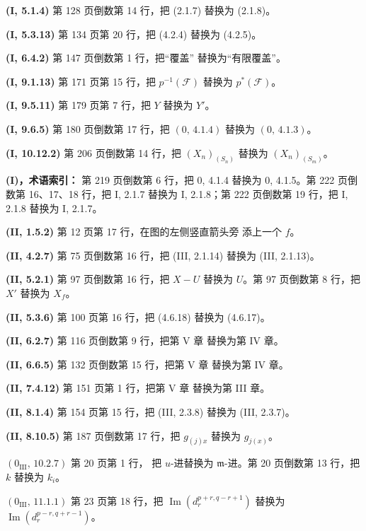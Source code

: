 \documentclass[UTF8,fontset=none,11pt,oneside,openany]{ctexbook}
\newcommand{\oldpage}[2][]{%
  \hypertarget{ega-source-page-#1-#2}{}%
  \marginnote{\scriptsize\textbf{#1}~|~#2}\ignorespaces}
\begin{document}
\noindent\textbf{(I, 5.1.4)} 第 128 页倒数第 14 行，把 (2.1.7)
替换为 (2.1.8)。

\noindent\textbf{(I, 5.3.13)} 第 134 页第 20 行，把 (4.2.4)
替换为 (4.2.5)。

\noindent\textbf{(I, 6.4.2)} 第 147 页倒数第 1 行，把“覆盖”
替换为“有限覆盖”。

\noindent\textbf{(I, 9.1.13)} 第 171 页第 15 行，把
$p^{-1}(\mathscr F)$ 替换为 $p^*(\mathscr F)$。

\noindent\textbf{(I, 9.5.11)} 第 179 页第 7 行，把 $Y$ 替换为 $Y'$。

\noindent\textbf{(I, 9.6.5)} 第 180 页倒数第 17 行，把
$(0,\,4.1.4)$ 替换为 $(0,\,4.1.3)$。

\noindent\textbf{(I, 10.12.2)} 第 206 页倒数第 14 行，把
$(X_n)_{(S_n)}$ 替换为 $(X_n)_{(S_m)}$。

\clearpage
\oldpage[III]{218}
\noindent\textbf{(I)，术语索引：} 第 219 页倒数第 6 行，把
0, 4.1.4 替换为 0, 4.1.5。第 222 页倒数第 16、17、18 行，把
I, 2.1.7 替换为 I, 2.1.8；第 222 页倒数第 19 行，把 I, 2.1.8
替换为 I, 2.1.7。

\noindent\textbf{(II, 1.5.2)} 第 12 页第 17 行，在图的左侧竖直箭头旁
添上一个 $f$。

\noindent\textbf{(II, 4.2.7)} 第 75 页倒数第 16 行，把
(III, 2.1.14) 替换为 (III, 2.1.13)。

\noindent\textbf{(II, 5.2.1)} 第 97 页倒数第 16 行，把 $X-U$
替换为 $U$。第 97 页倒数第 8 行，把 $X'$ 替换为 $X_f$。

\noindent\textbf{(II, 5.3.6)} 第 100 页第 16 行，把 (4.6.18)
替换为 (4.6.17)。

\noindent\textbf{(II, 6.2.7)} 第 116 页倒数第 9 行，把第 V 章
替换为第 IV 章。

\noindent\textbf{(II, 6.6.5)} 第 132 页倒数第 15 行，把第 V 章
替换为第 IV 章。

\noindent\textbf{(II, 7.4.12)} 第 151 页第 1 行，把第 V 章
替换为第 III 章。

\noindent\textbf{(II, 8.1.4)} 第 154 页第 15 行，把 (III, 2.3.8)
替换为 (III, 2.3.7)。

\noindent\textbf{(II, 8.10.5)} 第 187 页倒数第 17 行，把
$g_{(j)x}$ 替换为 $g_{j(x)}$。

\noindent\textbf{$(0_{\mathrm{III}},\,10.2.7)$} 第 20 页第 1 行，
把 $u$-进替换为 $\mathfrak m$-进。第 20 页倒数第 13 行，把 $k$
替换为 $k_i$。

\noindent\textbf{$(0_{\mathrm{III}},\,11.1.1)$} 第 23 页第 18 行，把
$\operatorname{Im}(d_r^{p+r,q-r+1})$ 替换为
$\operatorname{Im}(d_r^{p-r,q+r-1})$。
\end{document}
